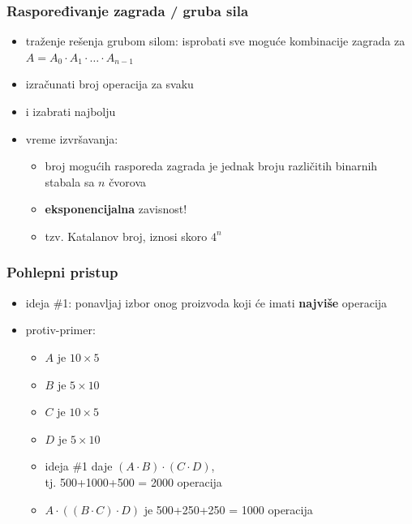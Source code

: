 \documentclass[compress]{beamer}
\begin{document}
\begin{frame}[fragile]
  \frametitle{Raspoređivanje zagrada / gruba sila}
  \begin{itemize}
    \item traženje rešenja grubom silom: isprobati sve moguće 
    kombinacije zagrada za $A=A_0 \cdot A_{1}\cdot \ldots\cdot A_{n-1}$ 
    \item izračunati broj operacija za svaku
    \item i izabrati najbolju
    \item vreme izvršavanja:
    \begin{itemize}
      \item broj mogućih rasporeda zagrada je jednak broju različitih 
      binarnih stabala sa $n$ čvorova
      \item \textbf{eksponencijalna} zavisnost!
      \item tzv. Katalanov broj, iznosi skoro $4^n$
    \end{itemize}
  \end{itemize}
\end{frame}

\begin{frame}[fragile]
  \frametitle{Pohlepni pristup}
  \begin{itemize}
    \item ideja \#1: ponavljaj izbor onog proizvoda koji će imati \textbf{najviše} operacija
    \item protiv-primer:
    \begin{itemize}
      \item $A$ je $10\times 5$
      \item $B$ je $5\times 10$
      \item $C$ je $10\times 5$
      \item $D$ je $5\times 10$
      \item ideja \#1 daje $(A\cdot B)\cdot (C\cdot D)$, \\ tj. 500+1000+500 = 2000 operacija
      \item $A\cdot ((B\cdot C)\cdot D)$ je 500+250+250 = 1000 operacija
    \end{itemize}
  \end{itemize}
\end{frame}
\end{document}
